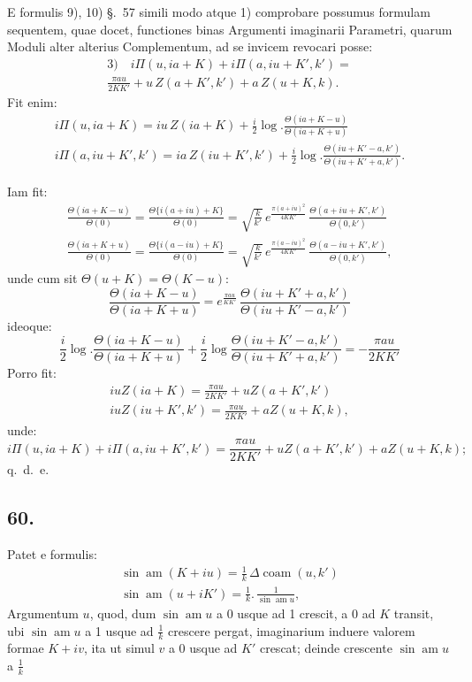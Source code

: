 \documentclass{article}
\begin{document}
E formulis 9), 10) §.\ 57 simili modo atque 1) comprobare possumus formulam sequentem, quae docet, functiones binas Argumenti imaginarii Parametri, quarum Moduli alter alterius Complementum, ad se invicem revocari posse:
\[
\begin{gathered}
\text{3)}\quad i\Pi(u,ia+K)+i\Pi(a,iu+K',k')=\\[1.5ex]
\frac{\pi au}{2KK'}+u\,Z(a+K',k')+a\,Z(u+K,k).
\end{gathered}
\]
Fit enim:
\[
\begin{gathered}
i\Pi(u,ia+K)=iu\,Z(ia+K)+\frac{i}{2}\log.\frac{\Theta(ia+K-u)}{\Theta(ia+K+u)}\\[1.5ex]
i\Pi(a,iu+K',k')=ia\,Z(iu+K',k')+\frac{i}{2}\log.\frac{\Theta(iu+K'-a,k')}{\Theta(iu+K'+a,k')}.
\end{gathered}
\]

Iam fit:
\[
\begin{gathered}
\frac{\Theta(ia+K-u)}{\Theta(0)}=\frac{\Theta\{i(a+iu)+K\}}{\Theta(0)}=\sqrt{\frac{k}{k'}}\,e^{\frac{\pi(a+iu)^{2}}{4KK'}}\,\frac{\Theta(a+iu+K',k')}{\Theta(0,k')}\\[1.5ex]
\frac{\Theta(ia+K+u)}{\Theta(0)}=\frac{\Theta\{i(a-iu)+K\}}{\Theta(0)}=\sqrt{\frac{k}{k'}}\,e^{\frac{\pi(a-iu)^{2}}{4KK'}}\,\frac{\Theta(a-iu+K',k')}{\Theta(0,k')},
\end{gathered}
\]
unde cum sit $\Theta(u+K)=\Theta(K-u)$:
\[
\frac{\Theta(ia+K-u)}{\Theta(ia+K+u)}=e^{\frac{\pi au}{KK'}}\,\frac{\Theta(iu+K'+a,k')}{\Theta(iu+K'-a,k')}
\]
ideoque:
\[
\frac{i}{2}\log.\frac{\Theta(ia+K-u)}{\Theta(ia+K+u)}+\frac{i}{2}\log\frac{\Theta(iu+K'-a,k')}{\Theta(iu+K'+a,k')}=-\frac{\pi au}{2KK'}
\]
Porro fit:
\[
\begin{gathered}
iuZ(ia+K)=\frac{\pi au}{2KK'}+uZ(a+K',k')\\[1.5ex]
iuZ(iu+K',k')=\frac{\pi au}{2KK'}+aZ(u+K,k),
\end{gathered}
\]
unde:
\[
i\Pi(u,ia+K)+i\Pi(a,iu+K',k')=\frac{\pi au}{2KK'}+uZ(a+K',k')+aZ(u+K,k);
\]
q.\ d.\ e.

\subsection*{60.}

Patet e formulis:
\[
\begin{gathered}
\sin\operatorname{am}(K+iu)=\frac{1}{k}\,\Delta\operatorname{coam}(u,k')\\[1.5ex]
\sin\operatorname{am}(u+iK')=\frac{1}{k}.\,\frac{1}{\sin\operatorname{am}u},
\end{gathered}
\]
Argumentum $u$, quod, dum $\sin\operatorname{am}u$ a 0 usque ad 1 crescit, a 0 ad $K$ transit, ubi $\sin\operatorname{am}u$ a 1 usque ad $\frac{1}{k}$ crescere pergat, imaginarium induere valorem formae $K+iv$, ita ut simul $v$ a 0 usque ad $K'$ crescat; deinde crescente $\sin\operatorname{am}u$ a $\frac{1}{k}$
\end{document}
